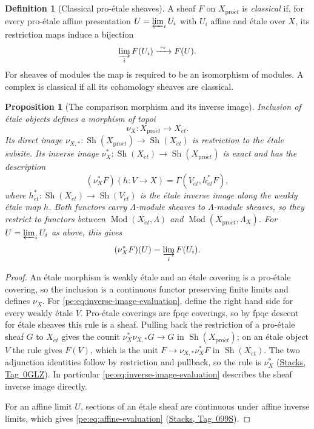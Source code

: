 \documentclass[11pt,a4paper]{article}
\numberwithin{equation}{section}
\newtheorem{proposition}[theorem]{Proposition}
\theoremstyle{definition}
\newtheorem{definition}[theorem]{Definition}
\theoremstyle{remark}
\newcommand{\Sh}{\operatorname{Sh}}
\newcommand{\Mod}{\operatorname{Mod}}
\newcommand{\et}{\acute{e}t}
\newcommand{\proet}{\mathrm{pro}\acute{e}t}
\newcommand{\stacks}[1]{\href{https://stacks.math.columbia.edu/tag/#1}{\textnormal{Stacks, Tag~#1}}}
\begin{document}
\begin{definition}[Classical pro-\'etale sheaves]
\label{pe:classical-definition}
A sheaf $F$ on $X_{\proet}$ is \emph{classical} if, for every
pro-\'etale affine presentation $U=\varprojlim_i U_i$ with $U_i$ affine
and \'etale over $X$, its restriction maps induce a bijection
\begin{equation}\label{pe:eq:classical-continuity}
 \varinjlim_i F(U_i)\xrightarrow{\ \sim\ }F(U).
\end{equation}
For sheaves of modules the map is required to be an isomorphism of
modules. A complex is classical if all its cohomology sheaves are
classical.
\end{definition}

\begin{proposition}[The comparison morphism and its inverse image]
\label{pe:comparison-morphism}
Inclusion of \'etale objects defines a morphism of topoi
\[
 \nu_X:X_{\proet}\longrightarrow X_{\et}.
\]
Its direct image $\nu_{X,*}\colon\Sh(X_{\proet})\to\Sh(X_{\et})$ is
restriction to the \'etale subsite. Its inverse image
$\nu_X^*\colon\Sh(X_{\et})\to\Sh(X_{\proet})$ is exact and has the
description
\begin{equation}\label{pe:eq:inverse-image-evaluation}
 (\nu_X^*F)(h:V\to X)
   =\Gamma(V_{\et},h_{\et}^*F),
\end{equation}
where $h_{\et}^*\colon\Sh(X_{\et})\to\Sh(V_{\et})$ is the \'etale inverse
image along the weakly \'etale map $h$. Both functors carry
$\Lambda$-module sheaves to $\Lambda$-module sheaves, so they restrict
to functors between $\Mod(X_{\et},\Lambda)$ and
$\Mod(X_{\proet},\Lambda_X)$.
For $U=\varprojlim_iU_i$ as above, this gives
\begin{equation}\label{pe:eq:affine-evaluation}
 (\nu_X^*F)(U)=\varinjlim_i F(U_i).
\end{equation}
\end{proposition}
\begin{proof}
An \'etale morphism is weakly \'etale and an \'etale covering is a
pro-\'etale covering, so the inclusion is a continuous functor
preserving finite limits and defines $\nu_X$. For
\eqref{pe:eq:inverse-image-evaluation}, define the right hand side for
every weakly \'etale $V$. Pro-\'etale coverings are fpqc coverings,
so by fpqc descent for \'etale sheaves this rule is a sheaf. Pulling
back the restriction of a pro-\'etale sheaf $G$ to $X_{\et}$ gives the
counit $\nu_X^*\nu_{X,*}G\to G$ in $\Sh(X_{\proet})$; on an \'etale
object $V$ the rule gives $F(V)$, which is the unit
$F\to\nu_{X,*}\nu_X^*F$ in $\Sh(X_{\et})$. The two adjunction identities follow by restriction and
pullback, so the rule is $\nu_X^*$ (\stacks{0GLZ}). In particular
\eqref{pe:eq:inverse-image-evaluation} describes the sheaf inverse
image directly.

For an affine limit $U$, sections of an \'etale sheaf are continuous
under affine inverse limits, which gives
\eqref{pe:eq:affine-evaluation} (\stacks{099S}).
\end{proof}
\end{document}
